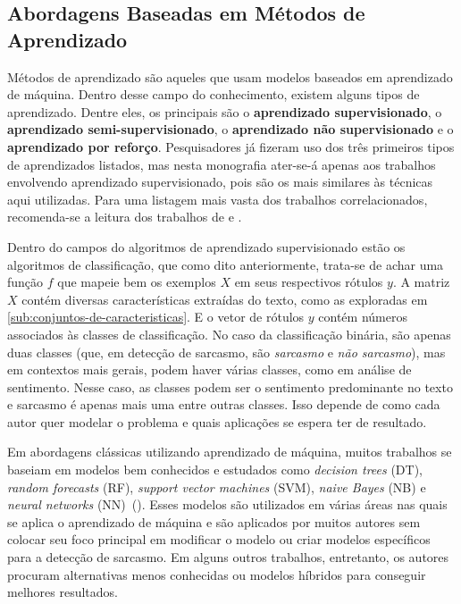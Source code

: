 \subsection{Abordagens Baseadas em Métodos de Aprendizado}%
\label{sub:abordagens_baseadas_em_metodos_de_aprendizado}

Métodos de aprendizado são aqueles que usam modelos baseados em aprendizado de
máquina. Dentro desse campo do conhecimento, existem alguns tipos de
aprendizado. Dentre eles, os principais são o \textbf{aprendizado
supervisionado}, o \textbf{aprendizado semi-supervisionado}, o
\textbf{aprendizado não supervisionado} e o \textbf{aprendizado por reforço}.
Pesquisadores já fizeram uso dos três primeiros tipos de aprendizados listados,
mas nesta monografia ater-se-á apenas aos trabalhos envolvendo aprendizado
supervisionado, pois são os mais similares às técnicas aqui utilizadas. Para uma
listagem mais vasta dos trabalhos correlacionados, recomenda-se a leitura dos
trabalhos de \cite{joshi:2017:sarcasm-detection-survey} e
\cite{yaghoobian:2021:sarcasm-detection-comparative-study}.

Dentro do campos do algoritmos de aprendizado supervisionado estão os algoritmos
de classificação, que como dito anteriormente, trata-se de achar uma função $f$
que mapeie bem os exemplos $X$ em seus respectivos rótulos $y$. A matriz $X$
contém diversas características extraídas do texto, como as exploradas em
\ref{sub:conjuntos-de-caracteristicas}. E o vetor de rótulos $y$ contém números
associados às classes de classificação. No caso da classificação binária, são
apenas duas classes (que, em detecção de sarcasmo, são \textit{sarcasmo} e
\textit{não sarcasmo}), mas em contextos mais gerais, podem haver várias
classes, como em análise de sentimento. Nesse caso, as classes podem ser o
sentimento predominante no texto e sarcasmo é apenas mais uma entre outras
classes. Isso depende de como cada autor quer modelar o problema e quais
aplicações se espera ter de resultado.

Em abordagens clássicas utilizando aprendizado de máquina, muitos trabalhos se
baseiam em modelos bem conhecidos e estudados como \textit{decision trees} (DT),
\textit{random forecasts} (RF), \textit{support vector machines} (SVM),
\textit{naive Bayes} (NB) e \textit{neural networks}
(NN)~(\cite{yaghoobian:2021:sarcasm-detection-comparative-study}). Esses modelos
são utilizados em várias áreas nas quais se aplica o aprendizado de máquina e
são aplicados por muitos autores sem colocar seu foco principal em modificar o
modelo ou criar modelos específicos para a detecção de sarcasmo. Em alguns
outros trabalhos, entretanto, os autores procuram alternativas menos conhecidas
ou modelos híbridos para conseguir melhores resultados.

